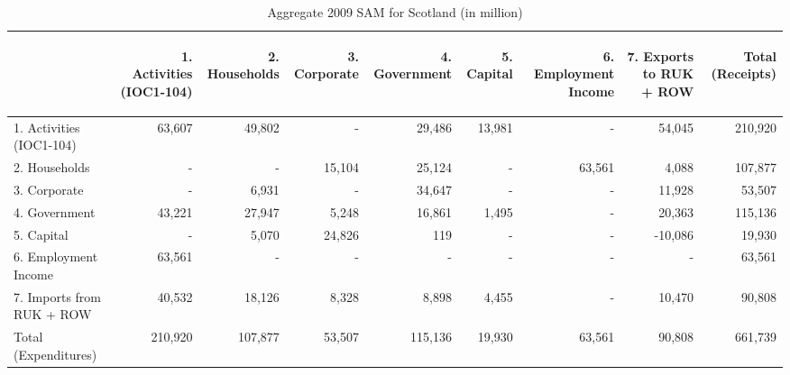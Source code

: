 \begin{table}[H] \caption{Aggregate 2009 SAM for Scotland (in \textsterling million)}
\bigskip \begin{scriptsize} \begin{centering} \begin{doublespacing}
    \begin{tabular}{lrrrrrrrr}
          \toprule
          & \begin{sideways}1. Activities (IOC1-104)\end{sideways} & \begin{sideways}2. Households\end{sideways} & \begin{sideways}3. Corporate\end{sideways} & \begin{sideways}4. Government\end{sideways} & \begin{sideways}5. Capital\end{sideways} & \begin{sideways}6. Employment Income\end{sideways} & \begin{sideways}7. Exports to RUK + ROW\end{sideways} & \begin{sideways}Total (Receipts)\end{sideways} \bigstrut\\
    \hline
    1. Activities (IOC1-104) & 63,607 & 49,802 & -     & 29,486 & 13,981 & -     & 54,045 & 210,920 \bigstrut[t]\\
    2. Households & -     & -     & 15,104 & 25,124 & -     & 63,561 & 4,088 & 107,877 \\
    3. Corporate & -     & 6,931 & -     & 34,647 & -     & -     & 11,928 & 53,507 \\
    4. Government & 43,221 & 27,947 & 5,248 & 16,861 & 1,495 & -     & 20,363 & 115,136 \bigstrut[b]\\
    \hline
    5. Capital & -     & 5,070 & 24,826 & 119   & -     & -     & -10,086 & 19,930 \bigstrut[t]\\
    6. Employment Income & 63,561 & -     & -     & -     & -     & -     & -     & 63,561 \\
    7. Imports from RUK + ROW & 40,532 & 18,126 & 8,328 & 8,898 & 4,455 & -     & 10,470 & 90,808 \bigstrut[b]\\
    \hline
    Total (Expenditures) & 210,920 & 107,877 & 53,507 & 115,136 & 19,930 & 63,561 & 90,808 & 661,739 \bigstrut\\
\bottomrule
\end{tabular}%
\bigskip \begin{flushright}\end{flushright} \label{tab:2.3.1}
\end{doublespacing} \end{centering} \end{scriptsize} \end{table} \bigskip

